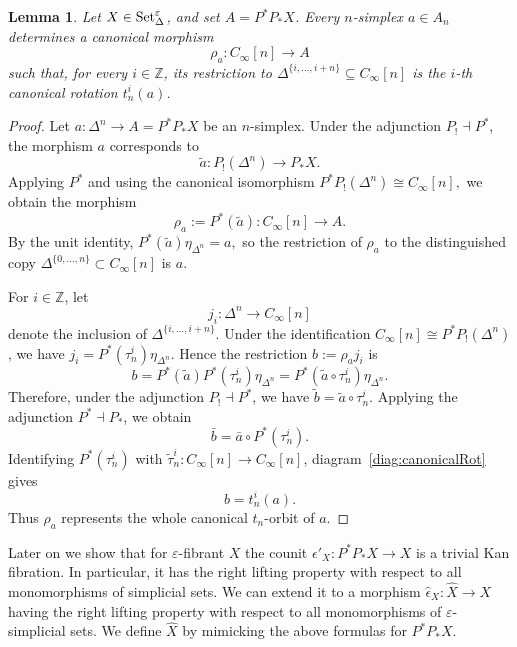 \documentclass{article}
\theoremstyle{plain}
\newtheorem{lemma}[theorem]{Lemma}
\theoremstyle{definition}
\theoremstyle{remark}
\begin{document}
\begin{lemma}\label{lem:canonicalOrbits}
Let \(X\in\mathrm{Set}^\varepsilon_\Delta\), and set \(A=P^*P_*X\).
    Every \(n\)-simplex \(a\in A_n\) determines a canonical morphism
    \[
        \rho_a\colon C_\infty[n]\longrightarrow A
    \]
    such that, for every \(i\in\mathbb Z\), its restriction to
    \(\Delta^{\{i,\ldots,i+n\}}\subseteq C_\infty[n]\)
    is the \(i\)-th canonical rotation \(t_n^i(a)\).
\end{lemma}
\begin{proof}
    Let
\(
    a\colon \Delta^n\longrightarrow A=P^*P_*X
\)
be an \(n\)-simplex. Under the adjunction \(P_!\dashv P^*\),
the morphism \(a\) corresponds to
\[
    \tilde{a}\colon P_!(\Delta^n)\longrightarrow P_*X.
\]
Applying \(P^*\) and using the canonical isomorphism
\(
    P^*P_!(\Delta^n)\cong C_\infty[n],
\)
we obtain the morphism
\[
    \rho_a:=P^*(\tilde{a})\colon C_\infty[n]\longrightarrow A.
\]
By the unit identity,
\(
    P^*(\tilde{a})\eta_{\Delta^n}=a,
\)
so the restriction of \(\rho_a\) to the distinguished copy
\(\Delta^{\{0,\ldots,n\}}\subset C_\infty[n]\) is \(a\).

For \(i\in\mathbb Z\), let
\[
    j_i\colon\Delta^n\longrightarrow C_\infty[n]
\]
denote the inclusion of
\(\Delta^{\{i,\ldots,i+n\}}\).
Under the identification
\(C_\infty[n]\cong P^*P_!(\Delta^n)\), we have
\(
    j_i=P^*(\tau_n^i)\eta_{\Delta^n}.
\)
Hence the restriction \(b:=\rho_a j_i\) is
\[
    b
    =P^*(\tilde{a})P^*(\tau_n^i)\eta_{\Delta^n}
    =P^*(\tilde{a}\circ\tau_n^i)\eta_{\Delta^n}.
\]
Therefore, under the adjunction \(P_!\dashv P^*\), we have
\(
    \tilde{b}=\tilde{a}\circ\tau_n^i.
\)
Applying the adjunction \(P^*\dashv P_*\), we obtain
\[
    \bar{b}
    =\bar{a}\circ P^*(\tau_n^i).
\]
Identifying \(P^*(\tau_n^i)\) with
\(\widetilde\tau_n^i\colon C_\infty[n]\to C_\infty[n]\),
diagram~\eqref{diag:canonicalRot} gives
\[
    b=t_n^i(a).
\]
Thus \(\rho_a\) represents the whole canonical \(t_n\)-orbit of \(a\).

\end{proof}
Later on we show that for $\varepsilon$-fibrant $X$ the counit $\epsilon'_X\colon P^*P_*X\rightarrow X$ is a trivial Kan fibration. In particular, it has the right lifting property with respect to all monomorphisms of simplicial sets.
We can extend it to a morphism $\hat{\epsilon}_X\colon\widehat{X}\rightarrow X$ having the right lifting property with respect to all monomorphisms of $\varepsilon$-simplicial sets.
We define $\widehat{X}$ by mimicking the above formulas for $P^*P_*X$.
\end{document}
